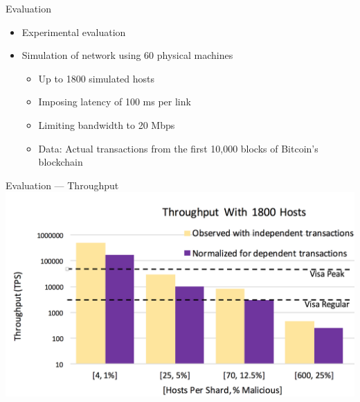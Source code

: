 	\begin{frame}{Evaluation}
		\begin{itemize}
			\item Experimental evaluation
			\item Simulation of network using 60 physical machines
			\begin{itemize}
				\item Up to 1800 simulated hosts
				\item Imposing latency of 100 ms per link
				\item Limiting bandwidth to 20 Mbps
				\item Data: Actual transactions from the first 10,000 blocks of Bitcoin's blockchain
			\end{itemize}
		\end{itemize}
	\end{frame}
	\note{
		\begin{itemize}
			\item 
		\end{itemize}
	}
	
	\begin{frame}{Evaluation --- Throughput}
		\centering
		\includegraphics[height=.75\textheight]{figures/results-throughput.png}
	\end{frame}
	
